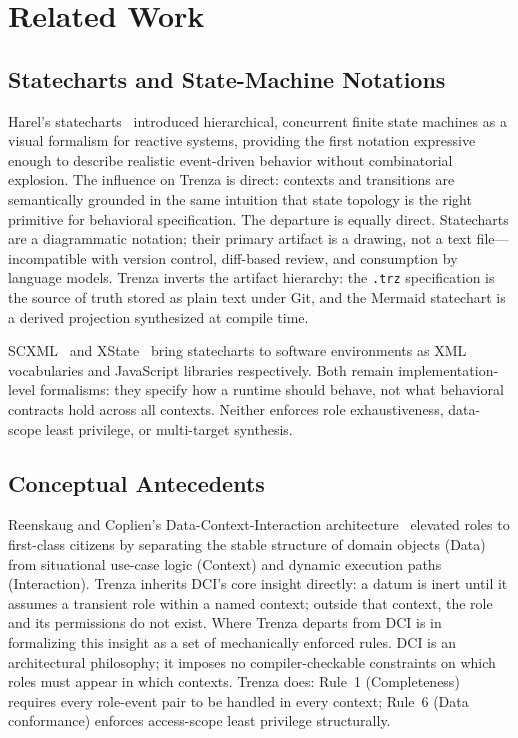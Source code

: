\section{Related Work}
\label{sec:related}

\subsection{Statecharts and State-Machine Notations}

Harel's statecharts~\cite{harel1987statecharts} introduced hierarchical,
concurrent finite state machines as a visual formalism for reactive systems,
providing the first notation expressive enough to describe realistic
event-driven behavior without combinatorial explosion. The influence on Trenza
is direct: contexts and transitions are semantically grounded in the same
intuition that state topology is the right primitive for behavioral
specification. The departure is equally direct. Statecharts are a diagrammatic
notation; their primary artifact is a drawing, not a text file---incompatible
with version control, diff-based review, and consumption by language models.
Trenza inverts the artifact hierarchy: the \texttt{.trz} specification is the
source of truth stored as plain text under Git, and the Mermaid statechart is a
derived projection synthesized at compile time.

SCXML~\cite{scxml2015} and XState~\cite{xstate2019} bring statecharts to
software environments as XML vocabularies and JavaScript libraries
respectively. Both remain implementation-level formalisms: they specify how a
runtime should behave, not what behavioral contracts hold across all contexts.
Neither enforces role exhaustiveness, data-scope least privilege, or
multi-target synthesis.

\subsection{Conceptual Antecedents}

Reenskaug and Coplien's Data-Context-Interaction architecture~\cite{reenskaug2009dci}
elevated roles to first-class citizens by separating the stable structure of
domain objects (Data) from situational use-case logic (Context) and dynamic
execution paths (Interaction). Trenza inherits DCI's core insight directly: a
datum is inert until it assumes a transient role within a named context; outside
that context, the role and its permissions do not exist. Where Trenza departs
from DCI is in formalizing this insight as a set of mechanically enforced rules.
DCI is an architectural philosophy; it imposes no compiler-checkable constraints
on which roles must appear in which contexts. Trenza does: Rule~1 (Completeness)
requires every role-event pair to be handled in every context; Rule~6 (Data
conformance) enforces access-scope least privilege structurally.


